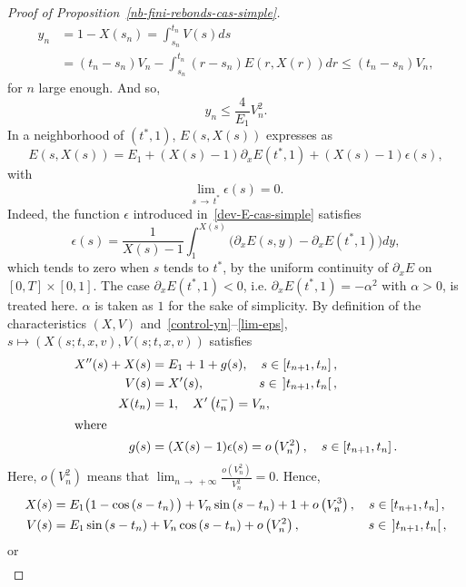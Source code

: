 \documentclass[AHL,Unicode,longabstracts,published]{cedram}
\begin{document}
\begin{proof}[{Proof of Proposition~\ref{nb-fini-rebonds-cas-simple}}]
\begin{align*}
y_n &= 1-X\left(s_n\right)= \int_{s_n}^{t_n} V(s)ds \\
&= \left(t_n - s_n\right) V_n - \int_{s_n}^{t_n} \left(r-s_n\right) E\left(r,X(r)\right)dr 
\leq \left(t_n-s_n\right)V_n,
\end{align*}
for $n$ large enough. And so,
\begin{equation}\label{control-yn}
y_n \leq \frac{4}{E_1}V_n^2.
\end{equation}
In a neighborhood of $(t^*,1)$, $E(s,X(s))$ expresses as
\begin{equation}\label{dev-E-cas-simple}
E(s,X(s)) = E_1 + (X(s)-1) \partial_x E(t^*,1)+(X(s)-1) \epsilon (s),
\end{equation}
with
\begin{equation}\label{lim-eps}
\lim_{s\,\to\,t^*} \epsilon (s) = 0.
\end{equation}
Indeed, the function $\epsilon $ introduced in~\eqref{dev-E-cas-simple} satisfies
\[
\epsilon (s)= \frac{1}{X(s)-1} \int_1^{X(s)} \big(\partial_x E(s,y) - \partial_x E(t^*,1)\big)dy,
\]
which tends to zero when $s$ tends to $t^*$, by the uniform continuity of $\partial_x E$ on\linebreak $[0,T] \times [0,1]$. The case $\partial_x E(t^*,1)<0$, i.e. $\partial_x E(t^*,1)= - \alpha^2 $ with $\alpha>0$, is treated here. $\alpha $ is taken as $1$ for the sake of simplicity. By definition of the characteristics $(X,V)$ and~\eqref{control-yn}--\eqref{lim-eps}, $s \mapsto (X(s;t,x,v), V(s;t,x,v))$ satisfies
\begin{align*}
X^{\prime \prime}(s) +X(s) &= E_1+ 1+g(s),\quad s\in \left[t_{n+1},t_n\right],\\
V(s) &= X^\prime (s),\mkern77mu s\in\,\left]t_{n+1},t_n\right[,\\
X(t_n) &= 1,\quad X^\prime \left(t_n^-\right)= V_n,
\\
\intertext{where}
g(s) &= (X(s)-1) \epsilon (s)= o\left(V_n^2\right),\quad s\in \left[t_{n+1},t_n\right].
\end{align*}
Here, $o(V_n^2)$ means that $\lim_{n\,\to\,+\infty}\tfrac{o(V_n^2)}{V_n^2}= 0$. Hence,
\begin{align*}
X(s) &= E_1\big(1-\cos \left(s-t_n\right)\big)+ V_n\sin \left(s-t_n\right)+ 1+o\left(V_n^3\right), \quad s\in \left[t_{n+1},t_n\right],\\
V(s) &= E_1\sin \left(s-t_n\right)+ V_n \cos \left(s-t_n\right)+o\left(V_n^2\right),\mkern96mu s\in\,\left]t_{n+1},t_n\right[,
\end{align*}
or
\begin{align}

\end{align}
\end{proof}
\end{document}

